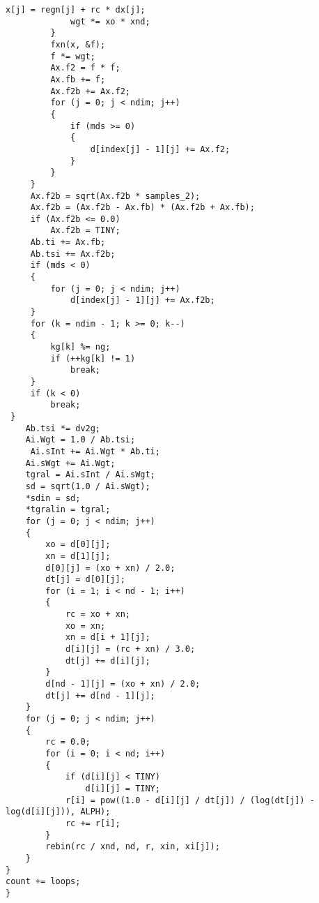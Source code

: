 \begin{lstlisting}[firstnumber=69]
             x[j] = regn[j] + rc * dx[j];
             wgt *= xo * xnd;
         }
         fxn(x, &f);
         f *= wgt;
         Ax.f2 = f * f;
         Ax.fb += f;
         Ax.f2b += Ax.f2;
         for (j = 0; j < ndim; j++)
         {
             if (mds >= 0)
             {
                 d[index[j] - 1][j] += Ax.f2;
             }
         }
     }
     Ax.f2b = sqrt(Ax.f2b * samples_2);
     Ax.f2b = (Ax.f2b - Ax.fb) * (Ax.f2b + Ax.fb);
     if (Ax.f2b <= 0.0)
         Ax.f2b = TINY;
     Ab.ti += Ax.fb;
     Ab.tsi += Ax.f2b;
     if (mds < 0)
     {
         for (j = 0; j < ndim; j++)
             d[index[j] - 1][j] += Ax.f2b;
     }
     for (k = ndim - 1; k >= 0; k--)
     {
         kg[k] %= ng;
         if (++kg[k] != 1)
             break;
     }
     if (k < 0)
         break;
 }
    Ab.tsi *= dv2g;
    Ai.Wgt = 1.0 / Ab.tsi;
     Ai.sInt += Ai.Wgt * Ab.ti;
    Ai.sWgt += Ai.Wgt;
    tgral = Ai.sInt / Ai.sWgt;
    sd = sqrt(1.0 / Ai.sWgt);
    *sdin = sd;
    *tgralin = tgral;
    for (j = 0; j < ndim; j++)
    {
        xo = d[0][j];
        xn = d[1][j];
        d[0][j] = (xo + xn) / 2.0;
        dt[j] = d[0][j];
        for (i = 1; i < nd - 1; i++)
        {
            rc = xo + xn;
            xo = xn;
            xn = d[i + 1][j];
            d[i][j] = (rc + xn) / 3.0;
            dt[j] += d[i][j];
        }
        d[nd - 1][j] = (xo + xn) / 2.0;
        dt[j] += d[nd - 1][j];
    }
    for (j = 0; j < ndim; j++)
    {
        rc = 0.0;
        for (i = 0; i < nd; i++)
        {
            if (d[i][j] < TINY)
                d[i][j] = TINY;
            r[i] = pow((1.0 - d[i][j] / dt[j]) / (log(dt[j]) - log(d[i][j])), ALPH);
            rc += r[i];
        }
        rebin(rc / xnd, nd, r, xin, xi[j]);
    }
}
count += loops;
}
\end{lstlisting}